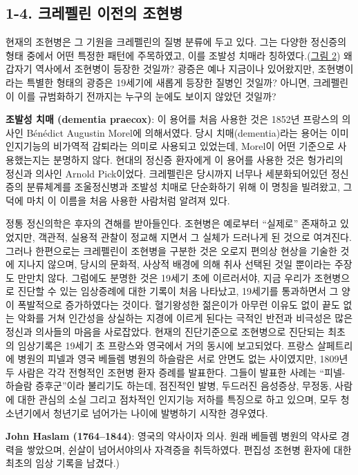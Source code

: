 \documentclass[
]{article}
\begin{document}
\hypertarget{before-kraepelin}{%
\subsection{1-4. 크레펠린 이전의 조현병}\label{before-kraepelin}}

현재의 조현병은 그 기원을 크레펠린의 질병 분류에 두고 있다. 그는 다양한
정신증의 형태 중에서 어떤 특정한 패턴에 주목하였고, 이를 조발성 치매라
칭하였다.(\protect\hyperlink{fig:praecox}{그림 2}) 왜 갑자기 역사에서
조현병이 등장한 것일까? 광증은 예나 지금이나 있어왔지만, 조현병이라는
특별한 형태의 광증은 19세기에 새롭게 등장한 질병인 것일까? 아니면,
크레펠린이 이를 규범화하기 전까지는 누구의 눈에도 보이지 않았던 것일까?

\textbf{조발성 치매 (dementia praecox)}: 이 용어를 처음 사용한 것은
1852년 프랑스의 의사인 Bénédict Augustin Morel에 의해서였다. 당시
치매(dementia)라는 용어는 이미 인지기능의 비가역적 감퇴라는 의미로
사용되고 있었는데, Morel이 어떤 기준으로 사용했는지는 분명하지 않다.
현대의 정신증 환자에게 이 용어를 사용한 것은 헝가리의 정신과 의사인
Arnold Pick이었다. 크레펠린은 당시까지 너무나 세분화되어있던 정신증의
분류체계를 조울정신병과 조발성 치매로 단순화하기 위해 이 명칭을
빌려왔고, 그 덕에 마치 이 이름을 처음 사용한 사람처럼 알려져 있다.

정통 정신의학은 후자의 견해를 받아들인다. 조현병은 예로부터 ``실제로''
존재하고 있었지만, 객관적, 실용적 관찰이 정교해 지면서 그 실체가
드러나게 된 것으로 여겨진다. 그러나 한편으로는 크레펠린이 조현병을
구분한 것은 오로지 편의상 현상을 기술한 것에 지나지 않으며, 당시의
문화적, 사상적 배경에 의해 취사 선택된 것일 뿐이라는 주장도 만만치 않다.
그럼에도 분명한 것은 19세기 초에 이르러서야, 지금 우리가 조현병으로
진단할 수 있는 임상증례에 대한 기록이 처음 나타났고, 19세기를 통과하면서
그 양이 폭발적으로 증가하였다는 것이다. 혈기왕성한 젊은이가 아무런
이유도 없이 끝도 없는 악화를 거쳐 인간성을 상실하는 지경에 이르게 된다는
극적인 반전과 비극성은 많은 정신과 의사들의 마음을 사로잡았다. 현재의
진단기준으로 조현병으로 진단되는 최초의 임상기록은 19세기 초 프랑스와
영국에서 거의 동시에 보고되었다. 프랑스 살페트리에 병원의 피넬과 영국
베들렘 병원의 하슬람은 서로 안면도 없는 사이였지만, 1809년 두 사람은
각각 전형적인 조현병 환자 증례를 발표한다. 그들이 발표한 사례는
``피넬-하슬람 증후군''이라 불리기도 하는데, 점진적인 발병, 두드러진
음성증상, 무정동, 사람에 대한 관심의 소실 그리고 점차적인 인지기능
저하를 특징으로 하고 있으며, 모두 청소년기에서 청년기로 넘어가는 나이에
발병하기 시작한 경우였다.

\textbf{John Haslam (1764--1844)}: 영국의 약사이자 의사. 원래 베들렘
병원의 약사로 경력을 쌓았으며, 쉰살이 넘어서야의사 자격증을 취득하였다.
편집성 조현병 환자에 대한 최초의 임상 기록을 남겼다.)
\end{document}
